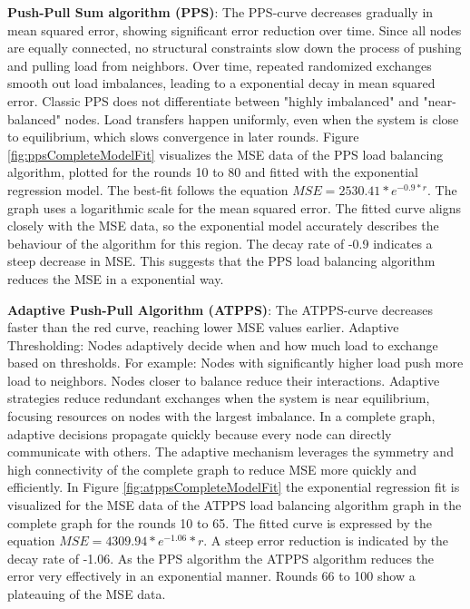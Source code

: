 
\textbf{Push-Pull Sum algorithm (PPS)}: The PPS-curve decreases gradually in mean squared error, showing significant error reduction over time. Since all nodes are equally connected, no structural constraints slow down the process of pushing and pulling load from neighbors. Over time, repeated randomized exchanges smooth out load imbalances, leading to a exponential decay in mean squared error. Classic PPS does not differentiate between "highly imbalanced" and "near-balanced" nodes. Load transfers happen uniformly, even when the system is close to equilibrium, which slows convergence in later rounds. Figure \ref{fig:ppsCompleteModelFit} visualizes the MSE data of the PPS load balancing algorithm, plotted for the rounds 10 to 80 and fitted with the exponential regression model. The best-fit follows the equation $MSE=2530.41*e^{-0.9*r}$. The graph uses a logarithmic scale for the mean squared error. The fitted curve aligns closely with the MSE data, so the exponential model accurately describes the behaviour of the algorithm for this region. The decay rate of -0.9 indicates a steep decrease in MSE. This suggests that the PPS load balancing algorithm reduces the MSE in a exponential way.


\textbf{Adaptive Push-Pull Algorithm (ATPPS)}: The ATPPS-curve decreases faster than the red curve, reaching lower MSE values earlier. Adaptive Thresholding: Nodes adaptively decide when and how much load to exchange based on thresholds. For example: Nodes with significantly higher load push more load to neighbors. Nodes closer to balance reduce their interactions. Adaptive strategies reduce redundant exchanges when the system is near equilibrium, focusing resources on nodes with the largest imbalance. In a complete graph, adaptive decisions propagate quickly because every node can directly communicate with others. The adaptive mechanism leverages the symmetry and high connectivity of the complete graph to reduce MSE more quickly and efficiently. In Figure \ref{fig:atppsCompleteModelFit} the exponential regression fit is visualized for the MSE data of the ATPPS load balancing algorithm graph in the complete graph for the rounds 10 to 65. The fitted curve is expressed by the equation $MSE=4309.94*e^{-1.06}*r$. A steep error reduction is indicated by the decay rate of -1.06. As the PPS algorithm the ATPPS algorithm reduces the error very effectively in an exponential manner. Rounds 66 to 100 show a plateauing of the MSE data.

